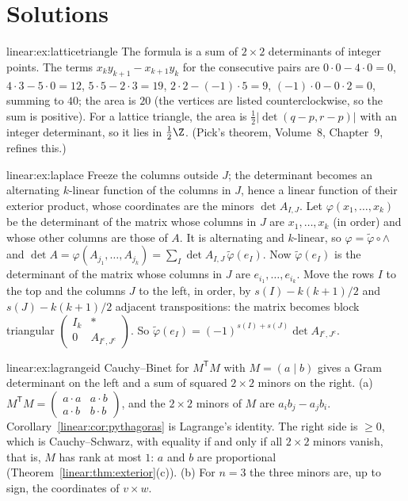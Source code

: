 \section{Solutions}

\begin{solution}{linear:ex:latticetriangle}
\idea The formula is a sum of $2\times2$ determinants of integer points.
\writeup The terms $x_ky_{k+1}-x_{k+1}y_k$ for the consecutive pairs are $0\cdot0-4\cdot0=0$, $4\cdot3-5\cdot0=12$,
$5\cdot5-2\cdot3=19$, $2\cdot2-(-1)\cdot5=9$, $(-1)\cdot0-0\cdot2=0$, summing to $40$; the area is $20$ (the vertices are listed
counterclockwise, so the sum is positive). For a lattice triangle, the area is $\frac12|\det(q-p,r-p)|$ with an integer
determinant, so it lies in $\frac12\Z$. (Pick's theorem, Volume~8, Chapter~9, refines this.)
\end{solution}

\begin{solution}{linear:ex:laplace}
\idea Freeze the columns outside $J$; the determinant becomes an alternating $k$-linear function of the columns in $J$,
hence a linear function of their exterior product, whose coordinates are the minors $\det A_{I,J}$.
\writeup Let $\varphi(x_1,\dots,x_k)$ be the determinant of the matrix whose columns in $J$ are $x_1,\dots,x_k$ (in order) and
whose other columns are those of $A$. It is alternating and $k$-linear, so $\varphi=\tilde\varphi\circ\wedge$ and
$\det A=\varphi(A_{j_1},\dots,A_{j_k})=\sum_I\det A_{I,J}\,\tilde\varphi(e_I)$. Now $\tilde\varphi(e_I)$ is the determinant of the matrix
whose columns in $J$ are $e_{i_1},\dots,e_{i_k}$. Move the rows $I$ to the top and the columns $J$ to the left, in order, by
$s(I)-k(k+1)/2$ and $s(J)-k(k+1)/2$ adjacent transpositions: the matrix becomes block triangular
$\begin{pmatrix}I_k&*\\0&A_{I^c,J^c}\end{pmatrix}$. So $\tilde\varphi(e_I)=(-1)^{s(I)+s(J)}\det A_{I^c,J^c}$.
\end{solution}

\begin{solution}{linear:ex:lagrangeid}
\idea Cauchy--Binet for $M^{\mathsf T}M$ with $M=(a\mid b)$ gives a Gram determinant on the left and a sum of squared
$2\times2$ minors on the right.
\writeup (a) $M^{\mathsf T}M=\begin{pmatrix}a\cdot a&a\cdot b\\a\cdot b&b\cdot b\end{pmatrix}$, and the $2\times2$ minors of $M$ are
$a_ib_j-a_jb_i$. Corollary~\ref{linear:cor:pythagoras} is Lagrange's identity. The right side is $\ge0$, which is Cauchy--Schwarz,
with equality if and only if all $2\times2$ minors vanish, that is, $M$ has rank at most $1$: $a$ and $b$ are proportional
(Theorem~\ref{linear:thm:exterior}(c)). (b) For $n=3$ the three minors are, up to sign, the coordinates of $v\times w$.
\end{solution}

